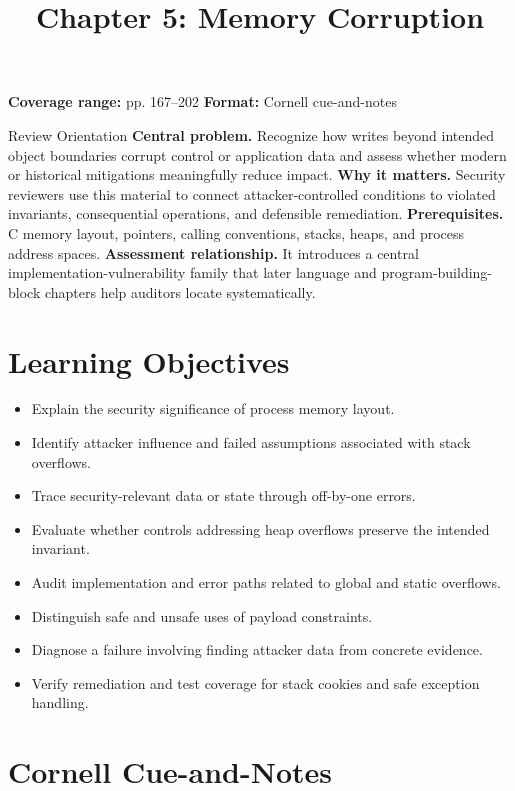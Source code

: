 \documentclass[11pt,letterpaper]{article}
\title{Chapter 5: Memory Corruption}
\author{}
\date{}
\begin{document}
\maketitle

\begin{center}
\small\color{Meta}\textbf{Coverage range:} pp. 167--202 \quad\textbullet\quad \textbf{Format:} Cornell cue-and-notes
\end{center}
\vspace{0.25em}
\begin{CornellOverviewBox}{Review Orientation}
\textbf{Central problem.} Recognize how writes beyond intended object boundaries corrupt control or application data and assess whether modern or historical mitigations meaningfully reduce impact.
\textbf{Why it matters.} Security reviewers use this material to connect attacker-controlled conditions to violated invariants, consequential operations, and defensible remediation.
\textbf{Prerequisites.} C memory layout, pointers, calling conventions, stacks, heaps, and process address spaces.
\textbf{Assessment relationship.} It introduces a central implementation-vulnerability family that later language and program-building-block chapters help auditors locate systematically.
\end{CornellOverviewBox}
\section{Learning Objectives}
\begin{itemize}
\item Explain the security significance of process memory layout.
\item Identify attacker influence and failed assumptions associated with stack overflows.
\item Trace security-relevant data or state through off-by-one errors.
\item Evaluate whether controls addressing heap overflows preserve the intended invariant.
\item Audit implementation and error paths related to global and static overflows.
\item Distinguish safe and unsafe uses of payload constraints.
\item Diagnose a failure involving finding attacker data from concrete evidence.
\item Verify remediation and test coverage for stack cookies and safe exception handling.
\end{itemize}
\section{Cornell Cue-and-Notes}
\end{document}
